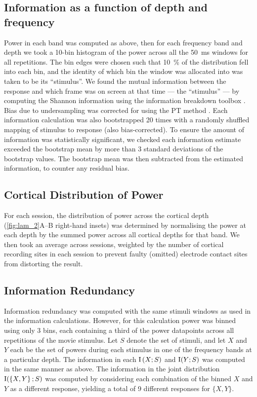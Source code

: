 \subsection{Information as a function of depth and frequency}

Power in each band was computed as above, then for each frequency band and depth we took a \num{10}-bin histogram of the power across all the \SI{50}{\milli\second} windows for all repetitions.
The bin edges were chosen such that \SI{10}{\percent} of the distribution fell into each bin, and the identity of which bin the window was allocated into was taken to be its ``stimulus''.
We found the mutual information between the response and which frame was on screen at that time --- the ``stimulus'' --- by computing the Shannon information using the information breakdown toolbox \citep{Magri2009}.
Bias due to undersampling was corrected for using the \ac{PT} method \citep{Treves1995}.
Each information calculation was also bootstrapped \num{20} times with a randomly shuffled mapping of stimulus to response (also bias-corrected).
To ensure the amount of information was statistically significant, we checked each information estimate exceeded the bootstrap mean by more than \num{3} standard deviations of the bootstrap values.
The bootstrap mean was then subtracted from the estimated information, to counter any residual bias.


\subsection{Cortical Distribution of Power}

For each session, the distribution of power across the cortical depth (\autoref{fig:lam_2}A--B right-hand insets) was determined by normalising the power at each depth by the summed power across all cortical depths for that band.
We then took an average across sessions, weighted by the number of cortical recording sites in each session to prevent faulty (omitted) electrode contact sites from distorting the result.


\subsection{Information Redundancy}

Information redundancy was computed with the same stimuli windows as used in the information calculations.
However, for this calculation power was binned using only \num{3} bins, each containing a third of the power datapoints across all repetitions of the movie stimulus.
Let $S$ denote the set of stimuli, and let $X$ and $Y$ each be the set of powers during each stimulus in one of the frequency bands at a particular depth.
The information in each $\operatorname{I}\left(X;S\right)$ and $\operatorname{I}(Y;S)$ was computed in the same manner as above.
The information in the joint distribution $\operatorname{I}(\left\{X,Y\right\};S)$ was computed by considering each combination of the binned $X$ and $Y$ as a different response, yielding a total of \num{9} different responses for $\{X,Y\}$.

